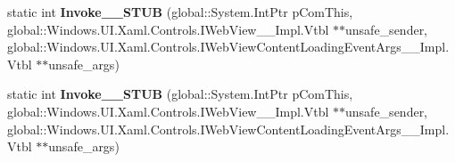 \begin{DoxyCompactItemize}
\mbox{\label{struct_windows_1_1_foundation_1_1_typed_event_handler___a___windows___u_i___xaml___controls___we27d953ba581e9b4ad25b4f27fbd2d234_a7ae7f192c8c6f908fd3a60da9ff8ae8e}} 
static int {\bfseries Invoke\+\_\+\+\_\+\+S\+T\+UB} (global\+::\+System.\+Int\+Ptr p\+Com\+This, global\+::\+Windows.\+U\+I.\+Xaml.\+Controls.\+I\+Web\+View\+\_\+\+\_\+\+Impl.\+Vtbl $\ast$$\ast$unsafe\+\_\+sender, global\+::\+Windows.\+U\+I.\+Xaml.\+Controls.\+I\+Web\+View\+Content\+Loading\+Event\+Args\+\_\+\+\_\+\+Impl.\+Vtbl $\ast$$\ast$unsafe\+\_\+args)
\item 
\mbox{\label{struct_windows_1_1_foundation_1_1_typed_event_handler___a___windows___u_i___xaml___controls___we27d953ba581e9b4ad25b4f27fbd2d234_a7ae7f192c8c6f908fd3a60da9ff8ae8e}} 
static int {\bfseries Invoke\+\_\+\+\_\+\+S\+T\+UB} (global\+::\+System.\+Int\+Ptr p\+Com\+This, global\+::\+Windows.\+U\+I.\+Xaml.\+Controls.\+I\+Web\+View\+\_\+\+\_\+\+Impl.\+Vtbl $\ast$$\ast$unsafe\+\_\+sender, global\+::\+Windows.\+U\+I.\+Xaml.\+Controls.\+I\+Web\+View\+Content\+Loading\+Event\+Args\+\_\+\+\_\+\+Impl.\+Vtbl $\ast$$\ast$unsafe\+\_\+args)
\end{DoxyCompactItemize}
